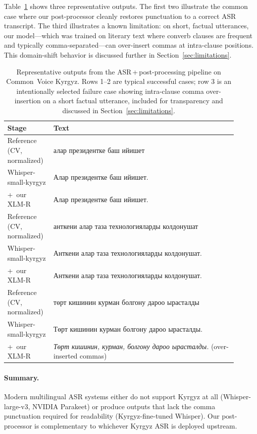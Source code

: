 \documentclass[manuscript, review]{acmart}
\begin{document}
Table~\ref{tab:asr-examples} shows three representative outputs. The first two illustrate the common case where our post-processor cleanly restores punctuation to a correct ASR transcript. The third illustrates a known limitation: on short, factual utterances, our model---which was trained on literary text where converb clauses are frequent and typically comma-separated---can over-insert commas at intra-clause positions. This domain-shift behavior is discussed further in Section~\ref{sec:limitations}.

\begin{table}[t]
\centering
\small
\caption{Representative outputs from the ASR\,+\,post-processing pipeline on Common~Voice Kyrgyz. Rows 1--2 are typical successful cases; row 3 is an intentionally selected failure case showing intra-clause comma over-insertion on a short factual utterance, included for transparency and discussed in Section~\ref{sec:limitations}.}
\label{tab:asr-examples}
\begin{tabular}{p{0.18\linewidth} p{0.74\linewidth}}
\toprule
\textbf{Stage} & \textbf{Text} \\
\midrule
Reference (CV, normalized) & алар президентке баш ийишет \\
Whisper-small-kyrgyz       & Алар президентке баш ийишет. \\
+\ our XLM-R               & Алар президентке баш ийишет. \\
\midrule
Reference (CV, normalized) & анткени алар таза технологияларды колдонушат \\
Whisper-small-kyrgyz       & Анткени алар таза технологияларды колдонушат. \\
+\ our XLM-R               & Анткени алар таза технологияларды колдонушат. \\
\midrule
Reference (CV, normalized) & төрт кишинин курман болгону дароо ырасталды \\
Whisper-small-kyrgyz       & Төрт кишинин курман болгону дароо ырасталды. \\
+\ our XLM-R               & \textit{Төрт кишинин, курман, болгону дароо ырасталды.} (over-inserted commas) \\
\bottomrule
\end{tabular}
\end{table}

\paragraph{Summary.} Modern multilingual ASR systems either do not support Kyrgyz at all (Whisper-large-v3, NVIDIA Parakeet) or produce outputs that lack the comma punctuation required for readability (Kyrgyz-fine-tuned Whisper). Our post-processor is complementary to whichever Kyrgyz ASR is deployed upstream.
\end{document}
